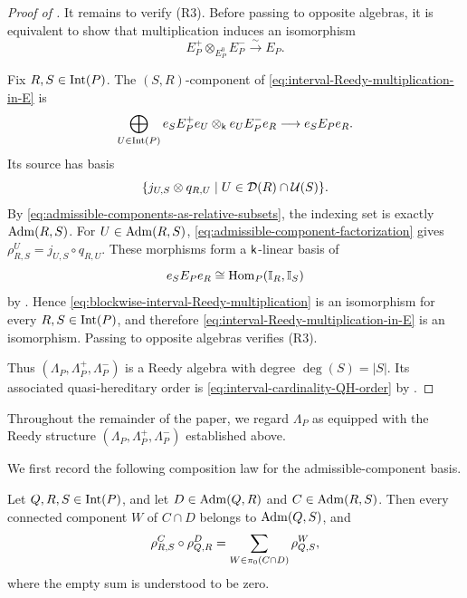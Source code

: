 \begin{proof}[Proof of ]
It remains to verify {\rm (R3)}.  Before passing to opposite algebras,
it is equivalent to show that multiplication induces an isomorphism
\begin{equation}
E_P^+
\otimes_{E_P^0}
E_P^-
\xrightarrow{\sim}
E_P.
\label{eq:interval-Reedy-multiplication-in-E}
\end{equation}

Fix $R,S\in\operatorname{Int}(P)$. 
The $(S,R)$-component of
\eqref{eq:interval-Reedy-multiplication-in-E} is
\begin{equation}
\bigoplus_{U\in\operatorname{Int}(P)}
e_SE_P^+e_U
\otimes_{\mathsf{k}}
e_UE_P^-e_R
\longrightarrow
e_SE_Pe_R.
\label{eq:blockwise-interval-Reedy-multiplication}
\end{equation}
Its source has basis
\[
\{j_{U,S}\otimes q_{R,U}
\mid
U\in\mathcal D(R)\cap\mathcal U(S)\}.
\]
By \eqref{eq:admissible-components-as-relative-subsets}, the indexing
set is exactly $\operatorname{Adm}(R,S)$.  
For $U\in\operatorname{Adm}(R,S)$, 
\eqref{eq:admissible-component-factorization} gives 
$\rho_{R,S}^{U} =j_{U,S}\circ q_{R,U}$. 
These morphisms form a $\mathsf{k}$-linear basis of
\[
e_SE_Pe_R
\cong
\operatorname{Hom}_P(\mathbb I_R,\mathbb I_S)
\]
by .  Hence
\eqref{eq:blockwise-interval-Reedy-multiplication} is an isomorphism
for every $R,S\in\operatorname{Int}(P)$, and therefore
\eqref{eq:interval-Reedy-multiplication-in-E} is an isomorphism.
Passing to opposite algebras verifies {\rm (R3)}.

Thus $(\Lambda_P,\Lambda_P^+,\Lambda_P^-)$ is a Reedy algebra with
degree $\deg(S)=|S|$.  Its associated quasi-hereditary order is
\eqref{eq:interval-cardinality-QH-order} by .
\end{proof}

Throughout the remainder of the paper, we regard $\Lambda_P$ as equipped with the Reedy structure $(\Lambda_P,\Lambda_P^+,\Lambda_P^-)$ established above.


We first record the following composition law for the admissible-component basis. 

\begin{proposition}
\label{prop:admissible-basis-composition}
Let $Q,R,S\in\operatorname{Int}(P)$, and let
$D\in\operatorname{Adm}(Q,R)$ and $C\in\operatorname{Adm}(R,S)$.
Then every connected component $W$ of $C\cap D$ belongs to
$\operatorname{Adm}(Q,S)$, and
\begin{equation}
\rho_{R,S}^{C}\circ\rho_{Q,R}^{D}
=
\sum_{W\in\pi_0(C\cap D)}
\rho_{Q,S}^{W},
\label{eq:admissible-basis-composition}
\end{equation}
where the empty sum is understood to be zero.
\end{proposition}

